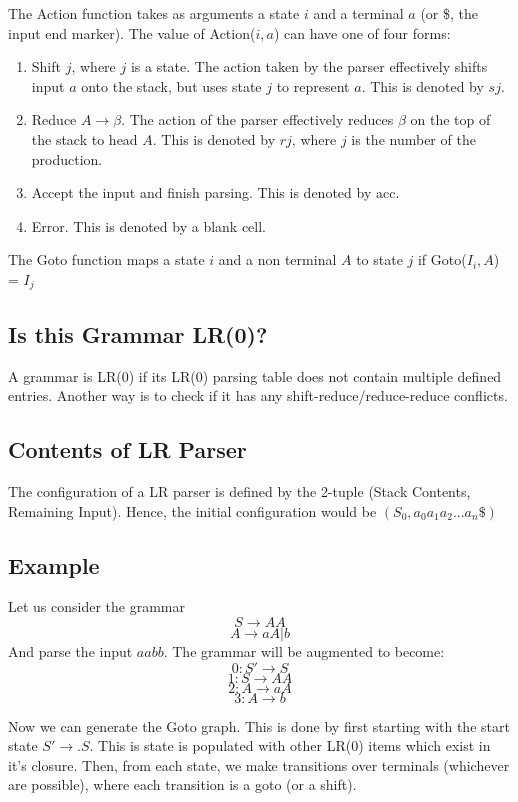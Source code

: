 \documentclass[12pt,letterpaper]{book}
\theoremstyle{definition}
\begin{document}
The Action function takes as arguments a state $i$ and a terminal $a$ (or \$, the input end marker). The value of Action($i,a$) can have one of four forms:
\begin{enumerate}
  \item Shift $j$, where $j$ is a state. The action taken by the parser effectively shifts input $a$ onto the stack, but uses state $j$ to represent $a$. This is denoted by $sj$.
  \item Reduce $A \rightarrow \beta$. The action of the parser effectively reduces $\beta$ on the top of the stack to head $A$. This is denoted by $rj$, where $j$ is the number of the production.
  \item Accept the input and finish parsing. This is denoted by acc.
  \item Error. This is denoted by a blank cell.
\end{enumerate}

The Goto function maps a state $i$ and a non terminal $A$ to state $j$ if Goto($I_i,A$) = $I_j$

\subsection{Is this Grammar LR(0)?} 

A grammar is LR(0) if its LR(0) parsing table does not contain multiple defined entries. Another way is to check if it has any shift-reduce/reduce-reduce conflicts.

\subsection{Contents of LR Parser}

The configuration of a LR parser is defined by the 2-tuple (Stack Contents, Remaining Input). Hence, the initial configuration would be $(S_0,a_0a_1a_2...a_n\$)$

\subsection{Example}

Let us consider the grammar
\[S \rightarrow AA\]
\[A \rightarrow aA|b\]
And parse the input $aabb$. The grammar will be augmented to become:
\[0:S' \rightarrow S\]
\[1:S \rightarrow AA\]
\[2:A \rightarrow aA\]
\[3:A \rightarrow b\]

Now we can generate the Goto graph. This is done by first starting with the start state $S' \rightarrow .S$. This is  state is populated with other LR(0) items which exist in it's closure. Then, from each state, we make transitions over terminals (whichever are possible), where each transition is a goto (or a shift).
\end{document}
